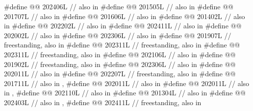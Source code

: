 \begin{codeblock}
#define @@                           202406L // also in 
#define @@                      201505L // also in 
#define @@                 201707L // also in 
#define @@              201606L // also in 
#define @@                201402L // also in 
#define @@                             202202L // also in 
#define @@                              202411L // also in 
#define @@           202002L // also in 
#define @@          202306L // also in 
#define @@                   201907L // freestanding, also in 
#define @@                              202311L // freestanding, also in 
#define @@             202311L // freestanding, also in 
#define @@                        202106L // also in 
#define @@                             201902L // freestanding, also in 
#define @@          202306L // also in 
#define @@                        202011L // also in 
#define @@                 202207L // freestanding, also in 
#define @@                  201711L // also in , 
#define @@                       202011L // also in 
#define @@                   202011L // also in , 
#define @@       202110L // also in 
#define @@                       201304L // also in 
#define @@                       202403L // also in , 
#define @@                         202411L // freestanding, also in 

\end{codeblock}
